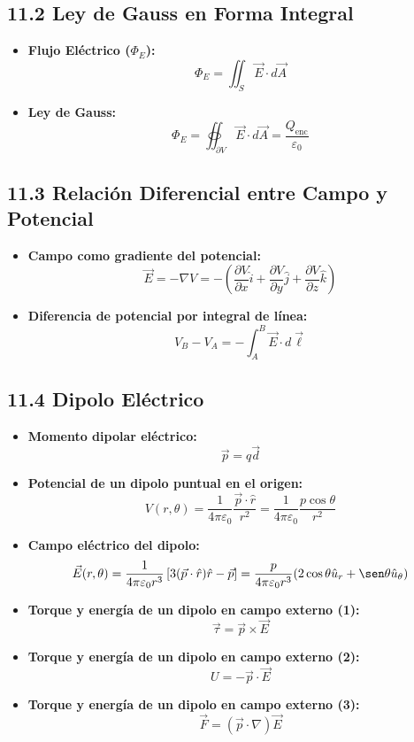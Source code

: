 \documentclass[11pt,a4paper]{article}
\begin{document}
\subsection*{11.2 Ley de Gauss en Forma Integral}

\begin{itemize}
  \item \textbf{Flujo Eléctrico ($\Phi_E$):}
  \[
    \Phi_E = \iint_S \vec{E} \cdot d\vec{A}
  \]
  \item \textbf{Ley de Gauss:}
  \[
    \Phi_E = \oiint_{\partial V} \vec{E} \cdot d\vec{A} = \frac{Q_{\mathrm{enc}}}{\varepsilon_0}
  \]
\end{itemize}

\subsection*{11.3 Relación Diferencial entre Campo y Potencial}

\begin{itemize}
  \item \textbf{Campo como gradiente del potencial:}
  \[
    \vec{E} = -\nabla V = -\left( \frac{\partial V}{\partial x}\hat{i} + \frac{\partial V}{\partial y}\hat{j} + \frac{\partial V}{\partial z}\hat{k} \right)
  \]
  \item \textbf{Diferencia de potencial por integral de línea:}
  \[
    V_B - V_A = -\int_A^B \vec{E} \cdot d\vec{\ell}
  \]
\end{itemize}

\subsection*{11.4 Dipolo Eléctrico}

\begin{itemize}
  \item \textbf{Momento dipolar eléctrico:}
  \[
    \vec{p} = q \vec{d}
  \]
  \item \textbf{Potencial de un dipolo puntual en el origen:}
  \[
    V(r, \theta) = \frac{1}{4\pi\varepsilon_0} \frac{\vec{p} \cdot \hat{r}}{r^2} = \frac{1}{4\pi\varepsilon_0} \frac{p \cos\theta}{r^2}
  \]
  \item \textbf{Campo eléctrico del dipolo:}
  \[
    \vec{E}(r, \theta) = \frac{1}{4\pi\varepsilon_0 r^3} \left[ 3(\vec{p} \cdot \hat{r})\hat{r} - \vec{p} \right] = \frac{p}{4\pi\varepsilon_0 r^3} (2\cos\theta \hat{u}_r + \sen\theta \hat{u}_\theta)
  \]
  \item \textbf{Torque y energía de un dipolo en campo externo (1):}
  \[
    \vec{\tau} = \vec{p} \times \vec{E}
  \]
  \item \textbf{Torque y energía de un dipolo en campo externo (2):}
  \[
    U = -\vec{p} \cdot \vec{E}
  \]
  \item \textbf{Torque y energía de un dipolo en campo externo (3):}
  \[
    \vec{F} = (\vec{p} \cdot \nabla)\vec{E}
  \]
\end{itemize}
\end{document}
